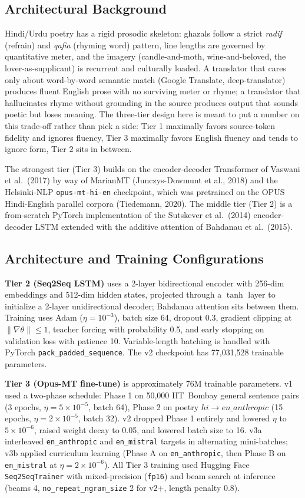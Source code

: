 \documentclass[11pt]{article}
\begin{document}
\subsection{Architectural Background}
Hindi/Urdu poetry has a rigid prosodic skeleton: ghazals follow a strict \emph{radif} (refrain) and \emph{qafia} (rhyming word) pattern, line lengths are governed by quantitative meter, and the imagery (candle-and-moth, wine-and-beloved, the lover-as-supplicant) is recurrent and culturally loaded. A translator that cares only about word-by-word semantic match (Google Translate, deep-translator) produces fluent English prose with no surviving meter or rhyme; a translator that hallucinates rhyme without grounding in the source produces output that sounds poetic but loses meaning. The three-tier design here is meant to put a number on this trade-off rather than pick a side: Tier 1 maximally favors source-token fidelity and ignores fluency, Tier 3 maximally favors English fluency and tends to ignore form, Tier 2 sits in between.

The strongest tier (Tier 3) builds on the encoder-decoder Transformer of Vaswani et al.\ (2017) by way of MarianMT (Junczys-Dowmunt et al., 2018) and the Helsinki-NLP \texttt{opus-mt-hi-en} checkpoint, which was pretrained on the OPUS Hindi-English parallel corpora (Tiedemann, 2020). The middle tier (Tier 2) is a from-scratch PyTorch implementation of the Sutskever et al.\ (2014) encoder-decoder LSTM extended with the additive attention of Bahdanau et al.\ (2015).

\subsection{Architecture and Training Configurations}
\textbf{Tier 2 (Seq2Seq LSTM)} uses a 2-layer bidirectional encoder with 256-dim embeddings and 512-dim hidden states, projected through a $\tanh$ layer to initialize a 2-layer unidirectional decoder; Bahdanau attention sits between them. Training uses Adam ($\eta{=}10^{-3}$), batch size 64, dropout 0.3, gradient clipping at $\|\nabla\theta\| \le 1$, teacher forcing with probability 0.5, and early stopping on validation loss with patience 10. Variable-length batching is handled with PyTorch \texttt{pack\_padded\_sequence}. The v2 checkpoint has 77{,}031{,}528 trainable parameters.

\textbf{Tier 3 (Opus-MT fine-tune)} is approximately 76M trainable parameters. v1 used a two-phase schedule: Phase 1 on 50{,}000 IIT~Bombay general sentence pairs (3 epochs, $\eta{=}5{\times}10^{-5}$, batch 64), Phase 2 on poetry $\mathit{hi} \rightarrow \mathit{en\_anthropic}$ (15 epochs, $\eta{=}2{\times}10^{-5}$, batch 32). v2 dropped Phase 1 entirely and lowered $\eta$ to $5{\times}10^{-6}$, raised weight decay to 0.05, and lowered batch size to 16. v3a interleaved \texttt{en\_anthropic} and \texttt{en\_mistral} targets in alternating mini-batches; v3b applied curriculum learning (Phase A on \texttt{en\_anthropic}, then Phase B on \texttt{en\_mistral} at $\eta{=}2{\times}10^{-6}$). All Tier 3 training used Hugging Face \texttt{Seq2SeqTrainer} with mixed-precision (\texttt{fp16}) and beam search at inference (beams 4, \texttt{no\_repeat\_ngram\_size} 2 for v2+, length penalty 0.8).
\end{document}
